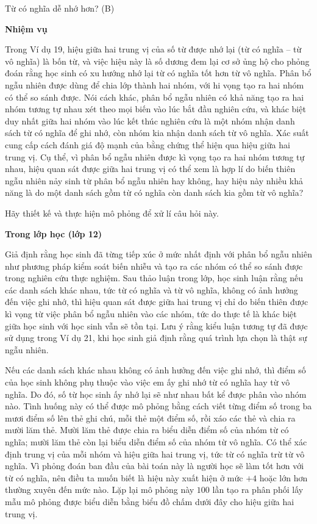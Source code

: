  {
    Từ có nghĩa dễ nhớ hơn? (B)
  }
  {
    \textbf{Nhiệm vụ}

    Trong Ví dụ 19, hiệu giữa hai trung vị của số từ được nhớ lại (từ có nghĩa -- từ vô nghĩa) là bốn từ, và việc hiệu này là số dương đem lại cơ sở ủng hộ cho phỏng đoán rằng học sinh có xu hướng nhớ lại từ có nghĩa tốt hơn từ vô nghĩa. Phân bổ ngẫu nhiên được dùng để chia lớp thành hai nhóm, với hi vọng tạo ra hai nhóm có thể so sánh được. Nói cách khác, phân bổ ngẫu nhiên có khả năng tạo ra hai nhóm tương tự nhau xét theo mọi biến vào lúc bắt đầu nghiên cứu, và khác biệt duy nhất giữa hai nhóm vào lúc kết thúc nghiên cứu là một nhóm nhận danh sách từ có nghĩa để ghi nhớ, còn nhóm kia nhận danh sách từ vô nghĩa. Xác suất cung cấp cách đánh giá độ mạnh của bằng chứng thể hiện qua hiệu giữa hai trung vị. Cụ thể, vì phân bổ ngẫu nhiên được kì vọng tạo ra hai nhóm tương tự nhau, hiệu quan sát được giữa hai trung vị có thể xem là hợp lí do biến thiên ngẫu nhiên nảy sinh từ phân bổ ngẫu nhiên hay không, hay hiệu này nhiều khả năng là do một danh sách gồm từ có nghĩa còn danh sách kia gồm từ vô nghĩa?\vspace{2\baselineskip}

    Hãy thiết kế và thực hiện mô phỏng để xử lí câu hỏi này.

    \textbf{Trong lớp học (lớp 12)}

    Giả định rằng học sinh đã từng tiếp xúc ở mức nhất định với phân bổ ngẫu nhiên như phương pháp kiểm soát biến nhiễu và tạo ra các nhóm có thể so sánh được trong nghiên cứu thực nghiệm. Sau thảo luận trong lớp, học sinh luận rằng nếu các danh sách khác nhau, tức từ có nghĩa và từ vô nghĩa, không có ảnh hưởng đến việc ghi nhớ, thì hiệu quan sát được giữa hai trung vị chỉ do biến thiên được kì vọng từ việc phân bổ ngẫu nhiên vào các nhóm, tức do thực tế là khác biệt giữa học sinh với học sinh vẫn sẽ tồn tại. Lưu ý rằng kiểu luận tương tự đã được sử dụng trong Ví dụ 21, khi học sinh giả định rằng quá trình lựa chọn là thật sự ngẫu nhiên.

    Nếu các danh sách khác nhau không có ảnh hưởng đến việc ghi nhớ, thì điểm số của học sinh không phụ thuộc vào việc em ấy ghi nhớ từ có nghĩa hay từ vô nghĩa. Do đó, số từ học sinh ấy nhớ lại sẽ như nhau bất kể được phân vào nhóm nào. Tình huống này có thể được mô phỏng bằng cách viết từng điểm số trong ba mươi điểm số lên thẻ ghi chú, mỗi thẻ một điểm số, rồi xáo các thẻ và chia ra mười lăm thẻ. Mười lăm thẻ được chia ra biểu diễn điểm số của nhóm từ có nghĩa; mười lăm thẻ còn lại biểu diễn điểm số của nhóm từ vô nghĩa. Có thể xác định trung vị của mỗi nhóm và hiệu giữa hai trung vị, tức từ có nghĩa trừ từ vô nghĩa. Vì phỏng đoán ban đầu của bài toán này là người học sẽ làm tốt hơn với từ có nghĩa, nên điều ta muốn biết là hiệu này xuất hiện ở mức $+4$ hoặc lớn hơn thường xuyên đến mức nào. Lặp lại mô phỏng này $100$ lần tạo ra phân phối lấy mẫu mô phỏng được biểu diễn bằng biểu đồ chấm dưới đây cho hiệu giữa hai trung vị.\vspace{1.75\baselineskip}

}
